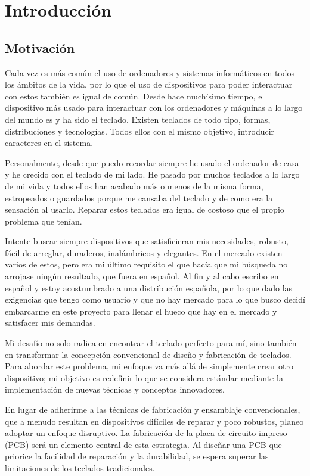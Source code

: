 \chapter{Introducción}
\section{Motivación}

Cada vez es más común el uso de ordenadores y sistemas informáticos en todos los ámbitos de la vida, por lo que el uso de dispositivos para poder interactuar con estos también es igual de común. Desde hace muchísimo tiempo, el dispositivo más usado para interactuar con los ordenadores y máquinas a lo largo del mundo es y ha sido el teclado. Existen teclados de todo tipo, formas, distribuciones y tecnologías. Todos ellos con el mismo objetivo, introducir caracteres en el sistema.

Personalmente, desde que puedo recordar siempre he usado el ordenador de casa y he crecido con el teclado de mi lado. He pasado por muchos teclados a lo largo de mi vida y todos ellos han acabado más o menos de la misma forma, estropeados o guardados porque me cansaba del teclado y de como era la sensación al usarlo. Reparar estos teclados era igual de costoso que el propio problema que tenían.

Intente buscar siempre dispositivos que satisficieran mis necesidades, robusto, fácil de arreglar, duraderos, inalámbricos y elegantes. En el mercado existen varios de estos, pero era mi último requisito el que hacía que mi búsqueda no arrojase ningún resultado, que fuera en español. Al fin y al cabo escribo en español y estoy acostumbrado a una distribución española, por lo que dado las exigencias que tengo como usuario y que no hay mercado para lo que busco decidí embarcarme en este proyecto para llenar el hueco que hay en el mercado y satisfacer mis demandas.

Mi desafío no solo radica en encontrar el teclado perfecto para mí, sino también en transformar la concepción convencional de diseño y fabricación de teclados. Para abordar este problema, mi enfoque va más allá de simplemente crear otro dispositivo; mi objetivo es redefinir lo que se considera estándar mediante la implementación de nuevas técnicas y conceptos innovadores.

En lugar de adherirme a las técnicas de fabricación y ensamblaje convencionales, que a menudo resultan en dispositivos difíciles de reparar y poco robustos, planeo adoptar un enfoque disruptivo. La fabricación de la placa de circuito impreso (\gls{PCB}) será un elemento central de esta estrategia. Al diseñar una \gls{PCB} que priorice la facilidad de reparación y la durabilidad, se espera superar las limitaciones de los teclados tradicionales.

